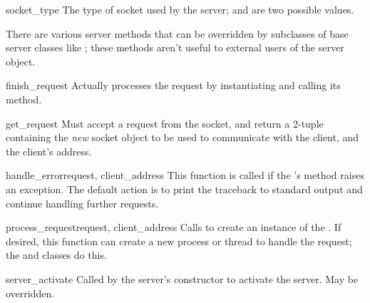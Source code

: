 \begin{datadesc}{socket_type}
The type of socket used by the server; 
and  are two possible values.
\end{datadesc}

There are various server methods that can be overridden by subclasses
of base server classes like ; these methods aren't
useful to external users of the server object.


\begin{funcdesc}{finish_request}{}
Actually processes the request by instantiating
 and calling its  method.
\end{funcdesc}

\begin{funcdesc}{get_request}{}
Must accept a request from the socket, and return a 2-tuple containing
the \emph{new} socket object to be used to communicate with the
client, and the client's address.
\end{funcdesc}

\begin{funcdesc}{handle_error}{request, client_address}
This function is called if the 's
 method raises an exception.  The default action is
to print the traceback to standard output and continue handling
further requests.
\end{funcdesc}

\begin{funcdesc}{process_request}{request, client_address}
Calls  to create an instance of the
.  If desired, this function can create a
new process or thread to handle the request; the 
and  classes do this.
\end{funcdesc}


\begin{funcdesc}{server_activate}{}
Called by the server's constructor to activate the server.
May be overridden.
\end{funcdesc}


